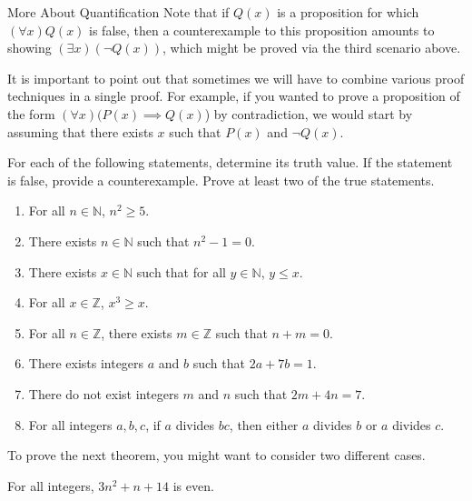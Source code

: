 \begin{section}{More About Quantification}
Note that if $Q(x)$ is a proposition for which $(\forall x)Q(x)$ is false, then a counterexample to this proposition amounts to showing $(\exists x)(\neg Q(x))$, which might be proved via the third scenario above.

It is important to point out that sometimes we will have to combine various proof techniques in a single proof.  For example, if you wanted to prove a proposition of the form $(\forall x)(P(x) \implies Q(x)$) by contradiction, we would start by assuming that there exists $x$ such that $P(x)$ and $\neg Q(x)$.

\begin{problem}
For each of the following statements, determine its truth value.  If the statement is false, provide a counterexample.  Prove at least two of the true statements.
\begin{enumerate}[label=\textrm{(\alph*)}]
\item For all $n\in\mathbb{N}$, $n^2\geq 5$.
\item There exists $n \in \mathbb{N}$ such that $n^2-1=0$.
\item There exists $x \in \mathbb{N}$ such that for all $y \in \mathbb{N}$, $y \leq x$.
\item For all $x\in\mathbb{Z}$, $x^3\geq x$.
\item For all $n\in\mathbb{Z}$, there exists $m\in\mathbb{Z}$ such that $n+m=0$.
\item There exists integers $a$ and $b$ such that $2a+7b=1$.
\item There do not exist integers $m$ and $n$ such that $2m+4n=7$.
\item For all integers $a, b, c$, if $a$ divides $bc$, then either $a$ divides $b$ or $a$ divides $c$.
\end{enumerate}
\end{problem}

To prove the next theorem, you might want to consider two different cases.

\begin{theorem}
For all integers, $3n^2+n+14$ is even.
\end{theorem}

\end{section}
